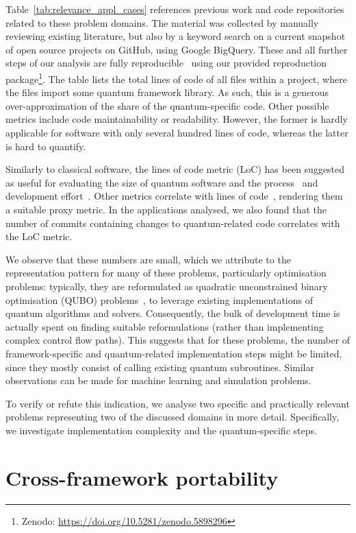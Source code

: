 \documentclass[conference]{IEEEtran}
\begin{document}
Table~\ref{tab:relevance_appl_cases} references previous work and code repositories related to these
problem domains. The material was collected by manually reviewing existing literature, but also by a
keyword search on a current snapshot of open source projects on GitHub, using Google BigQuery. These
and all further steps of our analysis are fully reproducible~\cite{Mauerer:2022} using our provided
reproduction package\footnote{Zenodo: \url{https://doi.org/10.5281/zenodo.5898296}}. The table lists
the total lines of code of all files within a project, where the files import some quantum framework
library. As such, this is a generous over-approximation of the share of the quantum-specific code.
Other possible metrics include code maintainability or readability. However, the former is hardly
applicable for software with only several hundred lines of code, whereas the latter is hard to
quantify. 

Similarly to classical software, the lines of code metric (LoC) has been suggested as useful for evaluating the size of quantum software and the process~\cite{ramsauer:2019} and development effort~\cite{Zhao.2021}. Other metrics correlate with lines of code~\cite{mamun.2017}, rendering them a suitable proxy metric. In the applications analysed, we also
found that the number of commits containing changes to quantum-related
code correlates with the LoC metric.

We observe that these numbers are small, which we attribute to the
representation pattern for many of these problems, particularly optimisation problems: typically, they are reformulated as quadratic unconstrained binary optimisation (QUBO) problems~\cite{Lucas.2014, Martonak.2004, Hogg.2003, Feld.2019, Gabor.2019}, to leverage existing implementations of quantum algorithms and solvers. Consequently, the bulk of development time is actually spent on finding suitable reformulations (rather than implementing complex control flow paths). This suggests that for these problems, the number of framework-specific and quantum-related implementation steps might be limited, since they mostly consist of calling existing quantum subroutines. Similar observations can be made for machine learning and simulation problems.

To verify or refute this indication, we analyse two specific and practically relevant problems representing two of the discussed domains in more detail. Specifically, we investigate implementation complexity and the quantum-specific steps.

\section{Cross-framework portability}
\label{sec:portability}
\end{document}
